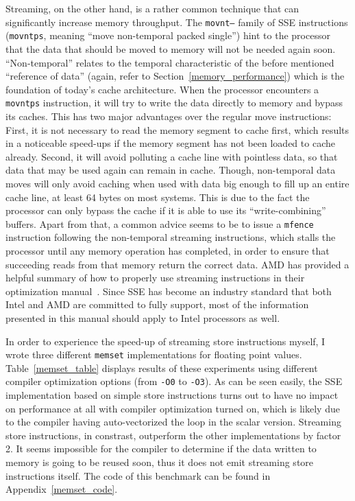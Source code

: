 Streaming, on the other hand, is a rather common technique that can significantly increase memory throughput. The \texttt{movnt--} family of SSE instructions (\eg \texttt{movntps}, meaning ``move non-temporal packed single'') hint to the processor that the data that should be moved to memory will not be needed again soon. ``Non-temporal'' relates to the temporal characteristic of the before mentioned ``reference of data'' (again, refer to Section~\ref{memory_performance}) which is the foundation of today's cache architecture. When the processor encounters a \texttt{movntps} instruction, it will try to write the data directly to memory and bypass its caches. This has two major advantages over the regular move instructions: First, it is not necessary to read the memory segment to cache first, which results in a noticeable speed-ups if the memory segment has not been loaded to cache already. Second, it will avoid polluting a cache line with pointless data, so that data that may be used again can remain in cache. Though, non-temporal data moves will only avoid caching when used with data big enough to fill up an entire cache line, \ie{}at least 64 bytes on most systems. This is due to the fact the processor can only bypass the cache if it is able to use its ``write-combining'' buffers. Apart from that, a common advice seems to be to issue a \texttt{mfence} instruction following the non-temporal streaming instructions, which stalls the processor until any memory operation has completed, in order to ensure that succeeding reads from that memory return the correct data. AMD has provided a helpful summary of how to properly use streaming instructions in their optimization manual~\cite[pp. 106ff, 231ff]{amd2012optimization}. Since SSE has become an industry standard that both Intel and AMD are committed to fully support, most of the information presented in this manual should apply to Intel processors as well.

In order to experience the speed-up of streaming store instructions myself, I wrote three different \texttt{memset} implementations for floating point values. Table~\ref{memset_table} displays results of these experiments using different compiler optimization options (from \texttt{-O0} to \texttt{-O3}). As can be seen easily, the SSE implementation based on simple store instructions turns out to have no impact on performance at all with compiler optimization turned on, which is likely due to the compiler having auto-vectorized the loop in the scalar version. Streaming store instructions, in constrast, outperform the other implementations by factor 2. It seems impossible for the compiler to determine if the data written to memory is going to be reused soon, thus it does not emit streaming store instructions itself. The code of this benchmark can be found in Appendix~\ref{memset_code}.

